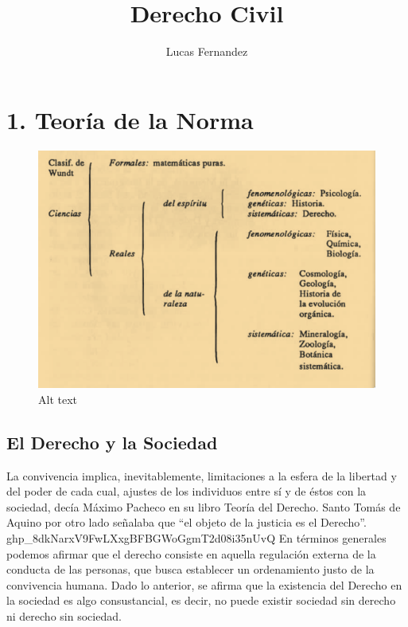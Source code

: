 \documentclass[]{article}
\title{Derecho Civil}
\author{Lucas Fernandez}
\date{}
\begin{document}
\maketitle

\hypertarget{teoruxeda-de-la-norma}{%
\section{1. Teoría de la Norma}\label{teoruxeda-de-la-norma}}

\begin{figure}
\centering
\includegraphics{wundt.png?raw=true}
\caption{Alt text}
\end{figure}

\hypertarget{el-derecho-y-la-sociedad}{%
\subsection{El Derecho y la Sociedad}\label{el-derecho-y-la-sociedad}}

La convivencia implica, inevitablemente, limitaciones a la esfera de la
libertad y del poder de cada cual, ajustes de los individuos entre sí y
de éstos con la sociedad, decía Máximo Pacheco en su libro Teoría del
Derecho. Santo Tomás de Aquino por otro lado señalaba que ``el objeto de
la justicia es el Derecho''. ghp\_8dkNarxV9FwLXxgBFBGWoGgmT2d08i35nUvQ
En términos generales podemos afirmar que el derecho consiste en aquella
regulación externa de la conducta de las personas, que busca establecer
un ordenamiento justo de la convivencia humana. Dado lo anterior, se
afirma que la existencia del Derecho en la sociedad es algo
consustancial, es decir, no puede existir sociedad sin derecho ni
derecho sin sociedad.
\end{document}
